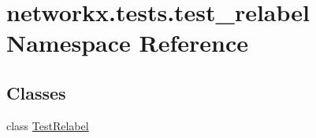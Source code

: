 \hypertarget{namespacenetworkx_1_1tests_1_1test__relabel}{}\section{networkx.\+tests.\+test\+\_\+relabel Namespace Reference}
\label{namespacenetworkx_1_1tests_1_1test__relabel}
\subsection*{Classes}
\begin{DoxyCompactItemize}
\item 
class \hyperlink{classnetworkx_1_1tests_1_1test__relabel_1_1TestRelabel}{Test\+Relabel}
\end{DoxyCompactItemize}
